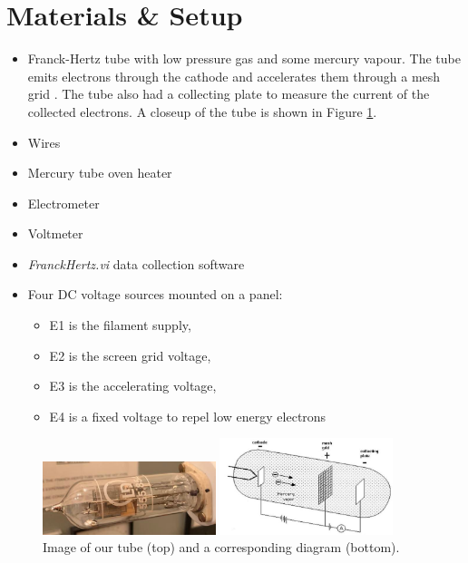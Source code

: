 \documentclass[12pt,twocolumn,letterpaper]{article}
\begin{document}
\section{Materials \& Setup}
\begin{itemize}
    \setlength\itemsep{0em}
    \item Franck-Hertz tube with low pressure gas and some mercury vapour. The tube emits electrons through the cathode and accelerates them through a mesh grid \cite{Franck_theory}. The tube also had a collecting plate to measure the current of the collected electrons. A closeup of the tube is shown in Figure \ref{tube_picture}.
    \item Wires
    \item Mercury tube oven heater
    \item Electrometer
    \item Voltmeter
    \item \textit{FranckHertz.vi} data collection software
    \item Four DC voltage sources mounted on a panel:
    \begin{itemize}
        \item E1 is the filament supply,
        \item E2 is the screen grid voltage,
        \item E3 is the accelerating voltage,
        \item E4 is a fixed voltage to repel low energy electrons
    \end{itemize}
\end{itemize}

\begin{figure}
\centering

   \includegraphics[width=0.45\textwidth]{figures/tube_picture.PNG}

   \includegraphics[width=0.45\textwidth]{figures/tube_schematic.PNG}
\caption{Image of our tube (top) and a corresponding diagram (bottom).}
\label{tube_picture} %
\end{figure}
\end{document}
